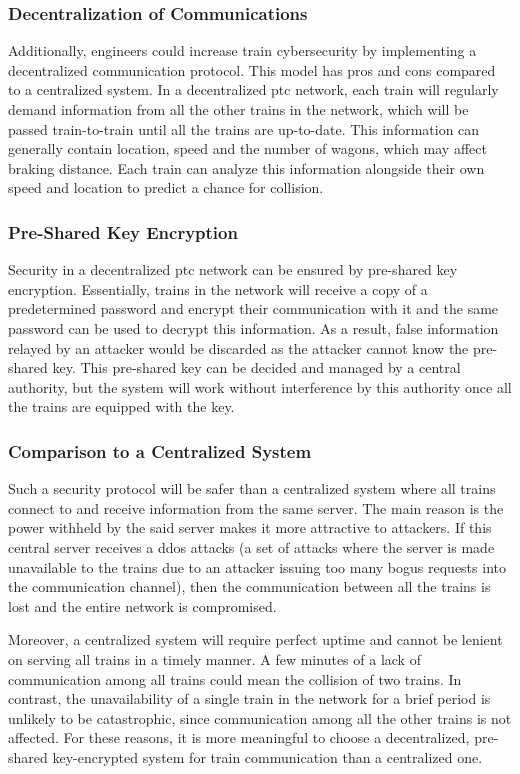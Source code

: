 \documentclass[11pt, titlepage]{article}
\begin{document}
\subsubsection{Decentralization of Communications}

Additionally, engineers could increase train cybersecurity by implementing a
decentralized communication protocol. This model has pros and cons compared to a
centralized system. In a decentralized \gls{ptc} network, each train will regularly
demand information from all the other trains in the network, which will be passed
train-to-train until all the trains are up-to-date. This information can generally
contain location, speed and the number of wagons, which may affect braking distance.
Each train can analyze this information alongside their own speed and location to
predict a chance for collision.

\subsubsection{Pre-Shared Key Encryption}

Security in a decentralized \gls{ptc} network can be ensured by pre-shared key
encryption. Essentially, trains in the network will receive a copy of a
predetermined password and encrypt their communication with it and the same password
can be used to decrypt this information. As a result, false information relayed by
an attacker would be discarded as the attacker cannot know the pre-shared key. This
pre-shared key can be decided and managed by a central authority, but the system
will work without interference by this authority once all the trains are equipped
with the key.

\subsubsection{Comparison to a Centralized System}

Such a security protocol will be safer than a centralized system where all trains
connect to and receive information from the same server. The main reason is the
power withheld by the said server makes it more attractive to attackers. If this
central server receives a \gls{ddos} attacks (a set of attacks where the server is
made unavailable to the trains due to an attacker issuing too many bogus requests
into the communication channel), then the communication between all the trains is
lost and the entire network is compromised.

Moreover, a centralized system will require perfect uptime and cannot be lenient on
serving all trains in a timely manner. A few minutes of a lack of communication
among all trains could mean the collision of two trains. In contrast, the
unavailability of a single train in the network for a brief period is unlikely to be
catastrophic, since communication among all the other trains is not affected. For
these reasons, it is more meaningful to choose a decentralized, pre-shared
key-encrypted system for train communication than a centralized one.
\end{document}

